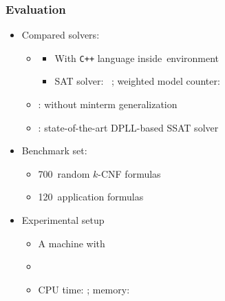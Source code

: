 \newcommand{\nrandom}{\num{700}}
\newcommand{\napplication}{\num{120}}
\newcommand{\nstrategic}{\num{60}}
\newcommand{\npec}{\num{60}}

\begin{frame}
    \frametitle{Evaluation}
    \begin{itemize}
        \item Compared solvers:
              \pause
              \begin{itemize}
                  \item \ressat
                        \pause
                        \begin{itemize}
                            \item With \texttt{C++} language inside~\abc environment~\cite{ABC}
                                  \pause
                            \item SAT solver: ~\cite{Een2003Solver}; weighted model counter: \cachet~\cite{Sang2004}
                                  \pause
                        \end{itemize}
                  \item \ressatb: \ressat without minterm generalization
                        \pause
                  \item \dcssat: state-of-the-art DPLL-based SSAT solver
                        \pause
              \end{itemize}
        \item Benchmark set:
              \pause
              \begin{itemize}
                  \item \nrandom~random $k$-CNF formulas
                        \pause
                  \item \napplication~application formulas
                        \pause
              \end{itemize}
        \item Experimental setup
              \pause
              \begin{itemize}
                  \item A machine with~\machineSpec
                        \pause
                  \item \osInfo
                        \pause
                  \item CPU time: \timelimit; memory: \memlimit
              \end{itemize}
    \end{itemize}
\end{frame}

